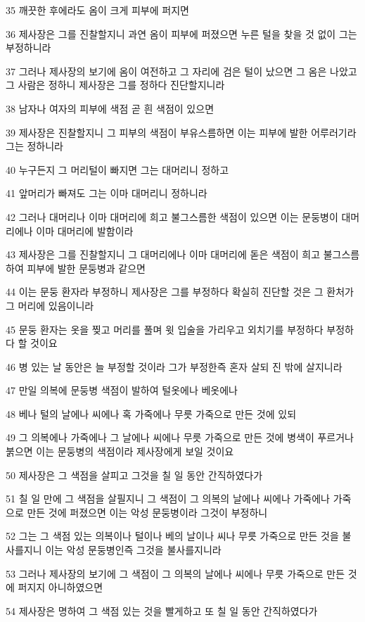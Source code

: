 \par 35 깨끗한 후에라도 옴이 크게 피부에 퍼지면
\par 36 제사장은 그를 진찰할지니 과연 옴이 피부에 퍼졌으면 누른 털을 찾을 것 없이 그는 부정하니라
\par 37 그러나 제사장의 보기에 옴이 여전하고 그 자리에 검은 털이 났으면 그 옴은 나았고 그 사람은 정하니 제사장은 그를 정하다 진단할지니라
\par 38 남자나 여자의 피부에 색점 곧 흰 색점이 있으면
\par 39 제사장은 진찰할지니 그 피부의 색점이 부유스름하면 이는 피부에 발한 어루러기라 그는 정하니라
\par 40 누구든지 그 머리털이 빠지면 그는 대머리니 정하고
\par 41 앞머리가 빠져도 그는 이마 대머리니 정하니라
\par 42 그러나 대머리나 이마 대머리에 희고 불그스름한 색점이 있으면 이는 문둥병이 대머리에나 이마 대머리에 발함이라
\par 43 제사장은 그를 진찰할지니 그 대머리에나 이마 대머리에 돋은 색점이 희고 불그스름하여 피부에 발한 문둥병과 같으면
\par 44 이는 문둥 환자라 부정하니 제사장은 그를 부정하다 확실히 진단할 것은 그 환처가 그 머리에 있음이니라
\par 45 문둥 환자는 옷을 찢고 머리를 풀며 윗 입술을 가리우고 외치기를 부정하다 부정하다 할 것이요
\par 46 병 있는 날 동안은 늘 부정할 것이라 그가 부정한즉 혼자 살되 진 밖에 살지니라
\par 47 만일 의복에 문둥병 색점이 발하여 털옷에나 베옷에나
\par 48 베나 털의 날에나 씨에나 혹 가죽에나 무릇 가죽으로 만든 것에 있되
\par 49 그 의복에나 가죽에나 그 날에나 씨에나 무릇 가죽으로 만든 것에 병색이 푸르거나 붉으면 이는 문둥병의 색점이라 제사장에게 보일 것이요
\par 50 제사장은 그 색점을 살피고 그것을 칠 일 동안 간직하였다가
\par 51 칠 일 만에 그 색점을 살필지니 그 색점이 그 의복의 날에나 씨에나 가죽에나 가죽으로 만든 것에 퍼졌으면 이는 악성 문둥병이라 그것이 부정하니
\par 52 그는 그 색점 있는 의복이나 털이나 베의 날이나 씨나 무릇 가죽으로 만든 것을 불사를지니 이는 악성 문둥병인즉 그것을 불사를지니라
\par 53 그러나 제사장의 보기에 그 색점이 그 의복의 날에나 씨에나 무릇 가죽으로 만든 것에 퍼지지 아니하였으면
\par 54 제사장은 명하여 그 색점 있는 것을 빨게하고 또 칠 일 동안 간직하였다가
